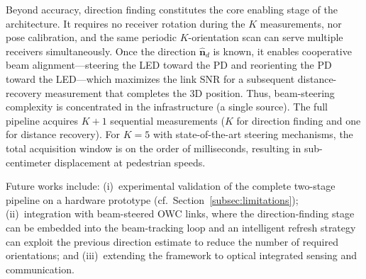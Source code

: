 \documentclass[journal]{IEEEtran}
\begin{document}
Beyond accuracy, direction finding constitutes the core enabling stage of the architecture. It requires no receiver rotation during the $K$ measurements, nor pose calibration, and the same periodic $K$-orientation scan can serve multiple receivers simultaneously. Once the direction $\hat{\mathbf{n}}_d$ is known, it enables cooperative beam alignment---steering the LED toward the PD and reorienting the PD toward the LED---which maximizes the link SNR for a subsequent distance-recovery measurement that completes the 3D position. Thus, beam-steering complexity is concentrated in the infrastructure (a single source). The full pipeline acquires $K+1$ sequential measurements ($K$ for direction finding and one for distance recovery). For $K=5$ with state-of-the-art steering mechanisms, the total acquisition window is on the order of milliseconds, resulting in sub-centimeter displacement at pedestrian speeds.

Future works include: (i)~experimental validation of the complete two-stage pipeline on a hardware prototype (cf.~Section~\ref{subsec:limitations}); (ii)~integration with beam-steered OWC links, where the direction-finding stage can be embedded into the beam-tracking loop and an intelligent refresh strategy can exploit the previous direction estimate to reduce the number of required orientations; and (iii)~extending the framework to optical integrated sensing and communication.


\appendices
\end{document}
